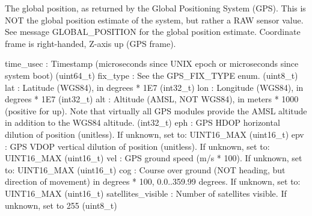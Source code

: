 \begin{DoxyVerb}
\begin{DoxyVerb}
\begin{DoxyVerb}The global position, as returned by the Global Positioning System
(GPS). This is                 NOT the global position
estimate of the system, but rather a RAW sensor value.
See message GLOBAL_POSITION for the global position
estimate. Coordinate frame is right-handed, Z-axis up
(GPS frame).

time_usec                 : Timestamp (microseconds since UNIX epoch or microseconds since system boot) (uint64_t)
fix_type                  : See the GPS_FIX_TYPE enum. (uint8_t)
lat                       : Latitude (WGS84), in degrees * 1E7 (int32_t)
lon                       : Longitude (WGS84), in degrees * 1E7 (int32_t)
alt                       : Altitude (AMSL, NOT WGS84), in meters * 1000 (positive for up). Note that virtually all GPS modules provide the AMSL altitude in addition to the WGS84 altitude. (int32_t)
eph                       : GPS HDOP horizontal dilution of position (unitless). If unknown, set to: UINT16_MAX (uint16_t)
epv                       : GPS VDOP vertical dilution of position (unitless). If unknown, set to: UINT16_MAX (uint16_t)
vel                       : GPS ground speed (m/s * 100). If unknown, set to: UINT16_MAX (uint16_t)
cog                       : Course over ground (NOT heading, but direction of movement) in degrees * 100, 0.0..359.99 degrees. If unknown, set to: UINT16_MAX (uint16_t)
satellites_visible        : Number of satellites visible. If unknown, set to 255 (uint8_t)\end{DoxyVerb}
 \mbox{\label{classpymavlink_1_1dialects_1_1v10_1_1MAVLink_a380392f2d25c410f2dedc9d02bddf488}} 

\end{DoxyVerb}
\end{DoxyVerb}
